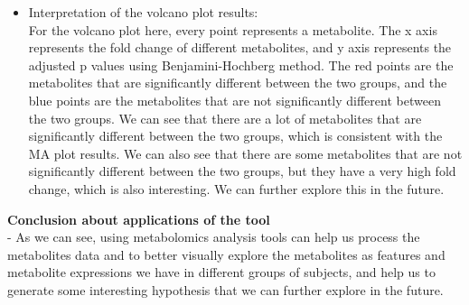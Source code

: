 \documentclass[
  letterpaper,
  DIV=11,
  numbers=noendperiod]{scrartcl}
\providecommand{\tightlist}{%
  \setlength{\itemsep}{0pt}\setlength{\parskip}{0pt}}\usepackage{longtable,booktabs,array}
\begin{document}
\begin{itemize}
\tightlist
\item
  Interpretation of the volcano plot results:\\
  For the volcano plot here, every point represents a metabolite. The x
  axis represents the fold change of different metabolites, and y axis
  represents the adjusted p values using Benjamini-Hochberg method. The
  red points are the metabolites that are significantly different
  between the two groups, and the blue points are the metabolites that
  are not significantly different between the two groups. We can see
  that there are a lot of metabolites that are significantly different
  between the two groups, which is consistent with the MA plot results.
  We can also see that there are some metabolites that are not
  significantly different between the two groups, but they have a very
  high fold change, which is also interesting. We can further explore
  this in the future.\\
\end{itemize}

\textbf{Conclusion about applications of the tool}\\
- As we can see, using metabolomics analysis tools can help us process
the metabolites data and to better visually explore the metabolites as
features and metabolite expressions we have in different groups of
subjects, and help us to generate some interesting hypothesis that we
can further explore in the future.\\
\end{document}
